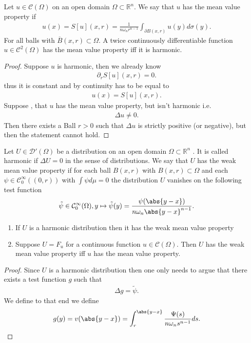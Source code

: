 \begin{Theorem}[3.5.]
 Let $u \in  \mathcal{C}(\Omega ) $ on an open domain $\Omega  \subset  \mathbb{R}^{n} $. We say that 
 $u$ has the mean value property if 
 \begin{align*}
   u(x) = S[u](x,r) = \frac{1}{n \omega_n r^{n-1} } \int_{\partial B(x,r)}u(y) d \sigma(y)
 .\end{align*}
 For all balls with $\overline{B}(x,r) \subset  \Omega.  $ A twice continuously differentiable function $u \in  \mathcal{C}^{2}(\Omega ) $ has the mean value property 
 iff it is harmonic.
\end{Theorem}
\begin{proof}
 Suppose $u$ is harmonic, then we already know 
 \begin{align*}
   \partial_r S[u](x,r) = 0
 .\end{align*}
 thus it is constant and by continuity has to be equal to 
 \begin{align*}
  u(x) =  S[u](x,r)
 .\end{align*}
 Suppose , that $u$ has the mean value property, but isn't harmonic i.e.
 \begin{align*}
  \Delta u \neq 0
 .\end{align*}
 Then there exists a Ball $r >0$ such that $\Delta  u$ is strictly positive (or negative),
 but then the statement cannot hold.
\end{proof}
\begin{Theorem}
 Let $U \in  \mathcal{D}'(\Omega )$ be a distribution on an open domain $\Omega  \subset  \mathbb{R}^{n} $ . It is called harmonic 
 if $\Delta  U = 0$ in the sense of distributions. We say that $U$ has the weak mean value property if for each ball $B(x,r)$ with $B(x,r) \subset  \Omega $ and 
 each $\psi  \in  \mathcal{C}_0^{\infty}((0,r)) $ with $\int \psi  d \mu  = 0 $ the distribution $U$ vanishes on the following test function 
 \begin{align*}
  \tilde{\psi } \in  \mathcal{C}_0^{\infty}(\Omega ), y \mapsto \tilde{\psi }(y) = \frac{\psi(\abs{y-x})}{n \omega_n \abs{y-x}^{n-1} }   
 .\end{align*}
 \begin{enumerate}
   \item If $U$ is a harmonic distribution then it has the weak mean value property 
   \item Suppose $U=F_u$ for a continuous function $u \in  \mathcal{C}(\Omega )$. Then $U$ has the weak mean value property iff $u$ has the mean value property.
 \end{enumerate}
\end{Theorem}
\begin{proof}
 Since $U$ is a harmonic distribution then one only needs to argue that there exists a test function $g$ such that 
 \begin{align*}
  \Delta  g  = \tilde{\psi }  
 .\end{align*}
 We define to that end we define 
 \begin{align*}
   g(y) = v(\abs{y-x}) = \int^{\abs{y-x}}_{r} \frac{\Psi(s)}{n \omega_n s^{n-1}  } ds
 .\end{align*}
\end{proof}
\newpage
